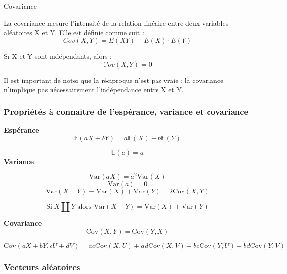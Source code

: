 \documentclass[
  letterpaper,
  DIV=11,
  numbers=noendperiod]{scrartcl}
\makeatletter
\let\oldsubparagraph\subparagraph
\renewcommand{\subparagraph}{
    \@ifstar
      \xxxSubParagraphStar
      \xxxSubParagraphNoStar
  }
\newcommand{\xxxSubParagraphStar}[1]{\oldsubparagraph*{#1}\mbox{}}
\newcommand{\xxxSubParagraphNoStar}[1]{\oldsubparagraph{#1}\mbox{}}
\makeatother
\begin{document}
\subparagraph{Covariance}\label{covariance}

La covariance mesure l'intensité de la relation linéaire entre deux
variables aléatoires X et Y. Elle est définie comme suit :
\[Cov(X, Y) = E(XY) - E(X) \cdot E(Y)\]

Si X et Y sont indépendants, alors : \[Cov(X, Y) = 0\]

\begin{tcolorbox}[enhanced jigsaw, rightrule=.15mm, bottomrule=.15mm, opacitybacktitle=0.6, leftrule=.75mm, colbacktitle=quarto-callout-warning-color!10!white, colback=white, opacityback=0, toprule=.15mm, left=2mm, title=\textcolor{quarto-callout-warning-color}{\faExclamationTriangle}\hspace{0.5em}{Warning}, breakable, bottomtitle=1mm, colframe=quarto-callout-warning-color-frame, toptitle=1mm, titlerule=0mm, coltitle=black, arc=.35mm]

Il est important de noter que la réciproque n'est pas vraie : la
covariance n'implique pas nécessairement l'indépendance entre X et Y.

\end{tcolorbox}

\newpage

\subsubsection{Propriétés à connaître de l'espérance, variance et
covariance}\label{propriuxe9tuxe9s-uxe0-connauxeetre-de-lespuxe9rance-variance-et-covariance}

\textbf{Espérance} \[
\mathbb{E}(aX + bY) = a\mathbb{E}(X) + b\mathbb{E}(Y)
\]

\[
\mathbb{E}(a) = a
\] \textbf{Variance}

\[
\text{Var}(aX) = a^2\text{Var}(X)
\] \[
\text{Var}(a) = 0
\] \[
\text{Var}(X + Y) = \text{Var}(X) + \text{Var}(Y) + 2\text{Cov}(X,Y)
\]

\[ \text{Si } X \coprod Y \text{ alors } \text{Var}(X+Y) = \text{Var}(X) + \text{Var}(Y)\]

\textbf{Covariance} \[
\text{Cov}(X, Y) = \text{Cov}(Y, X)
\]

\[
\text{Cov}(aX + bY, cU + dV) = ac\text{Cov}(X, U) + ad\text{Cov}(X, V) + bc\text{Cov}(Y, U) + bd\text{Cov}(Y, V)
\]

\newpage

\subsubsection{Vecteurs aléatoires}\label{vecteurs-aluxe9atoires}
\end{document}
